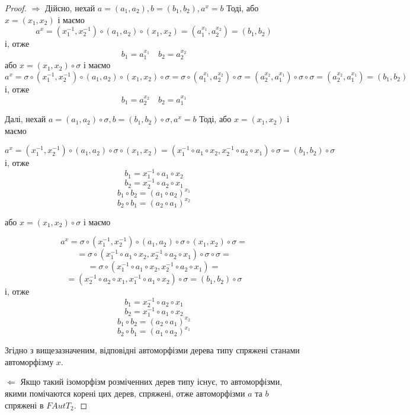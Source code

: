 \documentclass[a4paper,12pt]{article} \usepackage{a4wide}
\numberwithin{equation}{subsection}
\begin{document}
\begin{proof}

  $\Rightarrow$ Дійсно, нехай $a = (a_1, a_2), b = (b_1, b_2), a^x =
  b$ Тоді, або $x = (x_1, x_2)$ і маємо
$$a^x = (x_1^{-1},x_2^{-1})\circ (a_1,a_2)\circ (x_1, x_2) = (a_1^{x_1}, a_2^{x_2} ) = (b_1, b_2) $$ і, отже 
$$b_1 = a_1^{x_1} \quad b_2 = a_2^{x_2} $$
або $x = (x_1, x_2)\circ \sigma$ і маємо
$$a^x = \sigma \circ (x_1^{-1},x_2^{-1})\circ (a_1,a_2)\circ (x_1, x_2) \circ \sigma = \sigma \circ (a_1^{x_1}, a_2^{x_2} )\circ \sigma  = (a_2^{x_2}, a_1^{x_1} )\circ \sigma\circ \sigma = (a_2^{x_2}, a_1^{x_1} )= (b_1, b_2) $$ і, отже 
$$b_1 = a_2^{x_2}  \quad b_2 = a_1^{x_1} $$

Далі, нехай $a = (a_1,a_2)\circ \sigma, b = (b_1,b_2)\circ \sigma, a^x
= b$ Тоді, або $x = (x_1, x_2)$ і маємо

$$a^x = (x_1^{-1},x_2^{-1})\circ (a_1,a_2)\circ \sigma \circ (x_1, x_2) = (x_1^{-1}\circ a_1\circ x_2,x_2^{-1}\circ a_2 \circ x_1 )\circ \sigma = (b_1, b_2)\circ \sigma$$ і, отже 
$$b_1 =x_1^{-1}\circ a_1\circ x_2 $$
$$b_2 = x_2^{-1}\circ a_2 \circ x_1 $$
$$b_1\circ b_2 = (a_1\circ a_2)^{x_1} $$
$$b_2\circ b_1 = (a_2\circ a_1)^{x_2} $$


або $x = (x_1, x_2)\circ \sigma$ і маємо

$$a^x = \sigma \circ (x_1^{-1},x_2^{-1})\circ (a_1,a_2)\circ \sigma \circ (x_1, x_2) \circ \sigma =$$ $$=\sigma \circ  (x_1^{-1}\circ a_1\circ x_2,x_2^{-1}\circ a_2 \circ x_1 )\circ \sigma \circ \sigma =$$ $$= \sigma \circ  (x_1^{-1}\circ a_1\circ x_2,x_2^{-1}\circ a_2 \circ x_1 ) =  $$ $$= (x_2^{-1}\circ a_2 \circ x_1, x_1^{-1}\circ a_1\circ x_2 ) \circ \sigma = (b_1, b_2)\circ \sigma$$ і, отже 
$$b_1 =x_2^{-1}\circ a_2 \circ x_1 $$
$$b_2 = x_1^{-1}\circ a_1\circ x_2 $$
$$b_1\circ b_2 =(a_2\circ a_1)^{x_2} $$
$$b_2\circ b_1 =  (a_1\circ a_2)^{x_1} $$


Згідно з вищезазначеним, відповідні автоморфізми дерева типу спряжені
станами автоморфізму $x$.

$\Leftarrow$ Якщо такий ізоморфізм розміченних дерев типу існує, то
автоморфізми, якими помічаются корені цих дерев, спряжені, отже
автоморфізми $a$ та $b$ спряжені в $FAutT_2$.


\end{proof}
\end{document}
